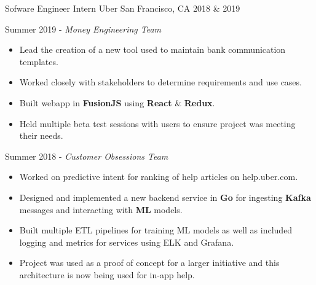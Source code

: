 

\begin{cventries}

  \cventry
    {Sofware Engineer Intern} %
    {Uber} %
    {San Francisco, CA} %
    {2018 \& 2019} %
    {
      \begin{cvitems} %
        \item {Summer 2019 - \textit{Money Engineering Team}}
        \begin{itemize}
          \item {Lead the creation of a new tool used to maintain bank communication templates.}
          \item {Worked closely with stakeholders to determine requirements and use cases.}
          \item {Built webapp in \textbf{FusionJS} using \textbf{React} \& \textbf{Redux}.}
          \item {Held multiple beta test sessions with users to ensure project was meeting their needs.}
        \end{itemize}
        \item {Summer 2018 - \textit{Customer Obsessions Team}}
        \begin{itemize}
          \item {Worked on predictive intent for ranking of help articles on help.uber.com.}
          \item {Designed and implemented a new backend service in \textbf{Go} for ingesting \textbf{Kafka} messages and interacting with \textbf{ML} models.}
          \item {Built multiple ETL pipelines for training ML models as well as included logging and metrics for services using ELK and Grafana.}
          \item {Project was used as a proof of concept for a larger initiative and this architecture is now being used for in-app help.}
        \end{itemize}
      \end{cvitems}
    }


\end{cventries}
